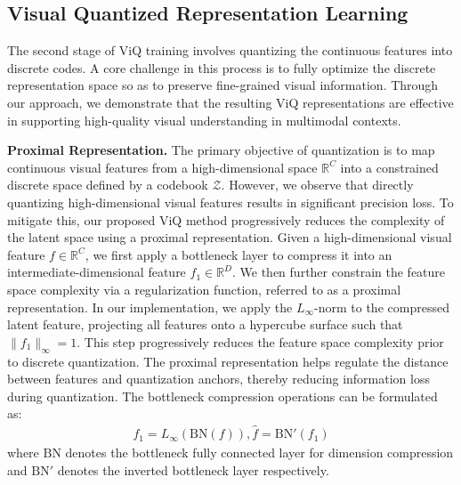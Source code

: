 \documentclass{llmxive}
\providecommand{\paragrapha}[1]{\par\addvspace{0.45em}\noindent\textbf{#1}}
\begin{document}
\subsection{Visual Quantized Representation Learning}
\label{sec:methods_2}

The second stage of ViQ training involves quantizing the continuous features into discrete codes. A core challenge in this process is to fully optimize the discrete representation space so as to preserve fine-grained visual information. Through our approach, we demonstrate that the resulting ViQ representations are effective in supporting high-quality visual understanding in multimodal contexts.

\paragrapha{Proximal Representation. }The primary objective of quantization is to map continuous visual features from a high-dimensional space $\mathbb{R}^{C}$ into a constrained discrete space defined by a codebook $\mathcal{Z}$. However, we observe that directly quantizing high-dimensional visual features results in significant precision loss. To mitigate this, our proposed ViQ method progressively reduces the complexity of the latent space using a proximal representation. Given a high-dimensional visual feature $f \in \mathbb{R}^C$, we first apply a bottleneck layer to compress it into an intermediate-dimensional feature $f_1 \in \mathbb{R}^D$. We then further constrain the feature space complexity via a regularization function, referred to as a proximal representation. In our implementation, we apply the $L_\infty$-norm to the compressed latent feature, projecting all features onto a hypercube surface such that $\lVert f_1 \rVert_\infty = 1$. This step progressively reduces the feature space complexity prior to discrete quantization. The proximal representation helps regulate the distance between features and quantization anchors, thereby reducing information loss during quantization. The bottleneck compression operations can be formulated as:
\begin{equation}
\begin{aligned}
    f_1=L_{\infty}(\text{BN}(f)), \hat{f}=\text{BN}'(f_1)
\end{aligned}
\end{equation}
where $\text{BN}$ denotes the bottleneck fully connected layer for dimension compression and $\text{BN}'$ denotes the inverted bottleneck layer respectively.
\end{document}
